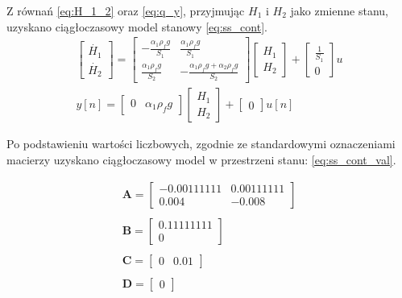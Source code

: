 \documentclass{article}
\begin{document}
Z równań \ref{eq:H_1_2} oraz \ref{eq:q_y}, przyjmując $H_1$ i $H_2$ jako zmienne stanu, uzyskano ciągłoczasowy model stanowy \ref{eq:ss_cont}.
\begin{equation}\label{eq:ss_cont}
 \begin{array}{l}
 
 \begin{bmatrix} \dot{H_1} \\ \dot{H_2} \end{bmatrix}  = 
 \begin{bmatrix} -\frac{\alpha_1 \rho_f g}{S_1} & \frac{\alpha_1 \rho_f g}{S_1}\\ 
  \frac{\alpha_1 \rho_f g}{S_2} & -\frac{\alpha_1 \rho_f g + \alpha_2 \rho_f g}{S_2} 
 \end{bmatrix}   \begin{bmatrix} H_1 \\ H_2 \end{bmatrix} + 
 \begin{bmatrix}\frac{1}{S_1} \\ 0\end{bmatrix}u  \\
 
 y[n]  = \begin{bmatrix} 0 & \alpha_1 \rho_f g \end{bmatrix}
 \begin{bmatrix} H_1 \\ H_2 \end{bmatrix} + 
 \begin{bmatrix} 0 \end{bmatrix} u[n]
 
 \end{array}
\end{equation}

Po podstawieniu wartości liczbowych, zgodnie ze standardowymi oznaczeniami macierzy uzyskano ciągłoczasowy model w przestrzeni stanu: \ref{eq:ss_cont_val}.

\begin{equation}\label{eq:ss_cont_val}
 \begin{array}{l}
  \mathbf{A} = \begin{bmatrix}  -0.00111111 &  0.00111111 \\
  							    0.004      & -0.008    
  			   \end{bmatrix} \\ \\
  \mathbf{B} = \begin{bmatrix} 0.11111111 \\ 0 \end{bmatrix} \\ \\
  \mathbf{C} = \begin{bmatrix} 0 & 0.01 \end{bmatrix} \\ \\
  \mathbf{D} = \begin{bmatrix} 0 \end{bmatrix} \\
\end{array}
\end{equation}
\end{document}
